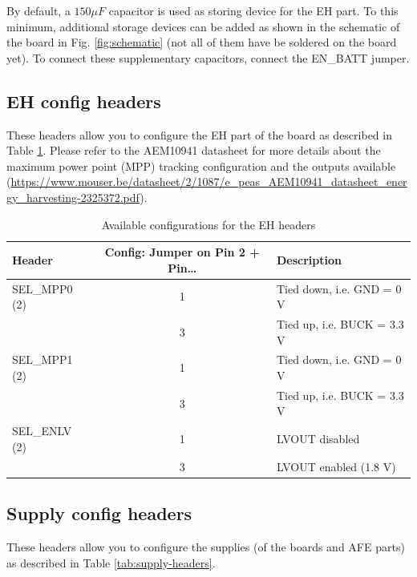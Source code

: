 By default, a $150 \mu F$ capacitor is used as storing device for the EH part. To this minimum, additional storage devices can be added as shown in the schematic of the board in Fig. \ref{fig:schematic} (not all of them have be soldered on the board yet). To connect these supplementary capacitors, connect the EN\_BATT jumper.

\subsection{EH config headers}

These headers allow you to configure the EH part of the board as described in Table \ref{tab:EH-headers}. Please refer to the AEM10941 datasheet for more details about the maximum power point (MPP) tracking configuration and the outputs available (\url{https://www.mouser.be/datasheet/2/1087/e_peas_AEM10941_datasheet_energy_harvesting-2325372.pdf}).

\begin{table}[h!]
    \centering
    \begin{tabular}{l c l}
         \textbf{Header} & \textbf{Config: Jumper on Pin 2 + Pin\dots} & \textbf{Description} \\
         \toprule
         SEL\_MPP0 (2) & 1 & Tied down, i.e. GND = 0 V  \\
                       & 3 & Tied up, i.e. BUCK = 3.3 V \\
         SEL\_MPP1 (2) & 1 & Tied down, i.e. GND = 0 V  \\
                       & 3 & Tied up, i.e. BUCK = 3.3 V \\
         SEL\_ENLV (2) & 1 & LVOUT disabled \\
                       & 3 & LVOUT enabled (1.8 V)\\
    \end{tabular}
    \caption{Available configurations for the EH headers}
    \label{tab:EH-headers}
\end{table}

\subsection{Supply config headers}

These headers allow you to configure the supplies (of the boards and AFE parts) as described in Table \ref{tab:supply-headers}.

